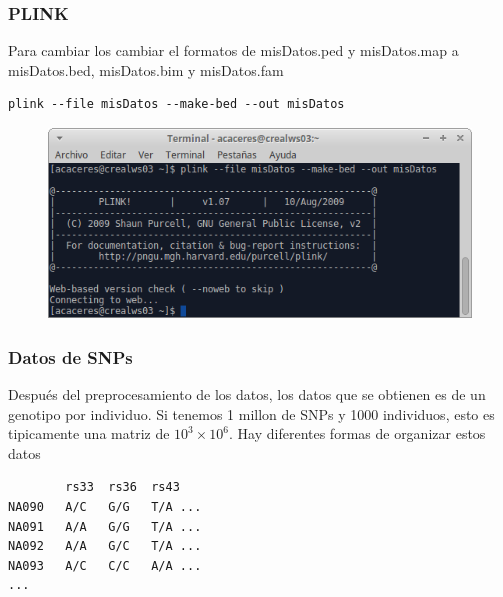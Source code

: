 \documentclass{beamer}\usepackage[]{graphicx}\usepackage[]{color}
\begin{document}
\begin{frame}[fragile]
\frametitle{PLINK}

Para cambiar los cambiar el formatos de misDatos.ped y misDatos.map a misDatos.bed, misDatos.bim y misDatos.fam

\begin{verbatim}
plink --file misDatos --make-bed --out misDatos
\end{verbatim}

\begin{figure}[htbp]
\begin{center}
\includegraphics[width=.8\linewidth]{command.png}
\end{center}
\end{figure}

\end{frame}



\begin{frame}[fragile]
\frametitle{Datos de SNPs}

Despu\'es del preprocesamiento de los datos, los datos que se obtienen es de un genotipo por individuo. Si tenemos 1 millon de SNPs y 1000 individuos, esto es tipicamente una matriz de $10^3 \times 10^6$. Hay diferentes formas de organizar estos datos
 
\begin{verbatim}
        rs33  rs36  rs43
NA090   A/C   G/G   T/A ...
NA091   A/A   G/G   T/A ...
NA092   A/A   G/C   T/A ...
NA093   A/C   C/C   A/A ...
...
\end{verbatim}
\end{frame}
\end{document}
